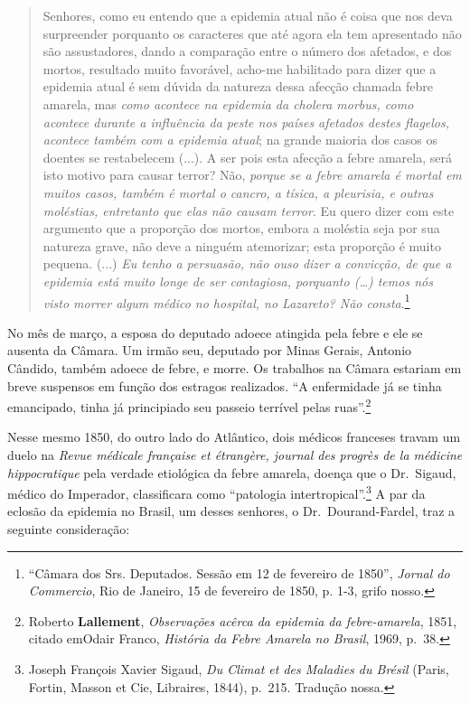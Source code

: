 \begin{quote}
Senhores, como eu entendo que a epidemia atual não é coisa que nos deva
surpreender porquanto os caracteres que até agora ela tem apresentado
não são assustadores, dando a comparação entre o número dos afetados, e
dos mortos, resultado muito favorável, acho-me habilitado para dizer que
a epidemia atual é sem dúvida da natureza dessa afecção chamada febre
amarela, mas \emph{como acontece na epidemia da cholera morbus, como
acontece durante a influência da peste nos países afetados destes
flagelos, acontece também com a epidemia atual}; na grande maioria dos
casos os doentes se restabelecem (...). A ser pois esta afecção a febre
amarela, será isto motivo para causar terror? Não, \emph{porque se a
febre amarela é mortal em muitos casos, também é mortal o cancro, a
tísica, a pleurisia, e outras moléstias, entretanto que elas não causam
terror}. Eu quero dizer com este argumento que a proporção dos mortos,
embora a moléstia seja por sua natureza grave, não deve a ninguém
atemorizar; esta proporção é muito pequena. (...) \emph{Eu tenho a
persuasão, não ouso dizer a convicção, de que a epidemia está muito
longe de ser contagiosa, porquanto (\ldots{}) temos nós visto morrer
algum médico no hospital, no Lazareto? Não consta}.\footnote{``Câmara
  dos Srs. Deputados. Sessão em 12 de fevereiro de 1850'', \emph{Jornal
  do Commercio}, Rio de Janeiro, 15 de fevereiro de 1850, p. 1-3, grifo
  nosso.}
\end{quote}

No mês de março, a esposa do deputado adoece atingida pela febre e ele
se ausenta da Câmara. Um irmão seu, deputado por Minas Gerais, Antonio
Cândido, também adoece de febre, e morre. Os trabalhos na Câmara
estariam em breve suspensos em função dos estragos realizados. ``A
enfermidade já se tinha emancipado, tinha já principiado seu passeio
terrível pelas ruas''.\footnote{Roberto \textbf{Lallement},
  \emph{Observações acêrca da epidemia da febre-amarela}, 1851, citado
  emOdair Franco, \emph{História da Febre Amarela no Brasil}, 1969,
  p.~38.}

Nesse mesmo 1850, do outro lado do Atlântico, dois médicos franceses
travam um duelo na \emph{Revue médicale française et étrangère, journal
des progrès de la médicine hippocratique} pela verdade etiológica da
febre amarela, doença que o Dr.~Sigaud, médico do Imperador,
classificara como ``patologia intertropical''.\footnote{Joseph François
  Xavier Sigaud, \emph{Du Climat et des Maladies du Brésil} (Paris,
  Fortin, Masson et Cie, Libraires, 1844), p.~215. Tradução nossa.} A
par da eclosão da epidemia no Brasil, um desses senhores, o
Dr.~Dourand-Fardel, traz a seguinte consideração:

